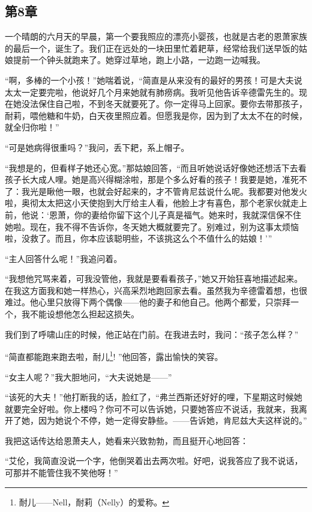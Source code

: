 \subsection{第8章}

\par 一个晴朗的六月天的早晨，第一个要我照应的漂亮小婴孩，也就是古老的恩萧家族的最后一个，诞生了。我们正在远处的一块田里忙着耙草，经常给我们送早饭的姑娘提前一个钟头就跑来了。她穿过草地，跑上小路，一边跑一边喊我。
\par “啊，多棒的一个小孩！”她喘着说，“简直是从来没有的最好的男孩！可是大夫说太太一定要完啦，他说好几个月来她就有肺痨病。我听见他告诉辛德雷先生的。现在她没法保住自己啦，不到冬天就要死了。你一定得马上回家。要你去带那孩子，耐莉，喂他糖和牛奶，白天夜里照应着。但愿我是你，因为到了太太不在的时候，就全归你啦！”
\par “可是她病得很重吗？”我问，丢下耙，系上帽子。
\par “我想是的，但看样子她还心宽。”那姑娘回答，“而且听她说话好像她还想活下去看孩子长大成人哩。她是高兴得糊涂啦，那是个多么好看的孩子！我要是她，准死不了：我光是瞅他一眼，也就会好起来的，才不管肯尼兹说什么呢。我都要对他发火啦，奥彻太太把这小天使抱到大厅给主人看，他脸上才有喜色，那个老家伙就走上前，他说：‘恩萧，你的妻给你留下这个儿子真是福气。她来时，我就深信保不住她啦。现在，我不得不告诉你，冬天她大概就要完了。别难过，别为这事太烦恼啦，没救了。而且，你本应该聪明些，不该挑这么个不值什么的姑娘！'”
\par “主人回答什么呢！”我追问着。
\par “我想他咒骂来着，可我没管他，我就是要看看孩子，”她又开始狂喜地描述起来。在我这方面我和她一样热心，兴高采烈地跑回家去看。虽然我为辛德雷着想，也很难过。他心里只放得下两个偶像——他的妻子和他自己。他两个都爱，只崇拜一个，我不能设想他怎么担起这损失。
\par 我们到了呼啸山庄的时候，他正站在门前。在我进去时，我问：“孩子怎么样？”
\par “简直都能跑来跑去啦，耐儿\footnote{耐儿——Nell，耐莉（Nelly）的爱称。}! ”他回答，露出愉快的笑容。
\par “女主人呢？”我大胆地问，“大夫说她是——”
\par “该死的大夫！”他打断我的话，脸红了，“弗兰西斯还好好的哩，下星期这时候她就要完全好啦。你上楼吗？你可不可以告诉她，只要她答应不说话，我就来，我离开了她，因为她说个不停，她一定得安静些。——告诉她，肯尼兹大夫这样说的。”
\par 我把这话传达给恩萧夫人，她看来兴致勃勃，而且挺开心地回答：
\par “艾伦，我简直没说一个字，他倒哭着出去两次啦。好吧，说我答应了我不说话，可那并不能管住我不笑他呀！”

